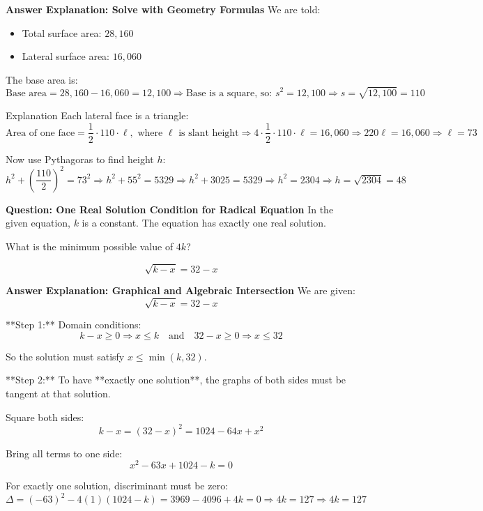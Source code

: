 \documentclass{beamer}
\begin{document}
\begin{frame}{\textbf{Answer Explanation: Solve with Geometry Formulas}}
\small
We are told:
\begin{itemize}
    \item Total surface area: $28,\!160$
    \item Lateral surface area: $16,\!060$
\end{itemize}

The base area is:
\[
\text{Base area} = 28,\!160 - 16,\!060 = 12,\!100

\Rightarrow \text{Base is a square, so: } s^2 = 12,\!100 \Rightarrow s = \sqrt{12,\!100} = 110
\]


\end{frame}

\begin{frame}{Explanation}
Each lateral face is a triangle:
\[
\text{Area of one face} = \frac{1}{2} \cdot 110 \cdot \ell, \text{ where } \ell \text{ is slant height}

\Rightarrow 4 \cdot \frac{1}{2} \cdot 110 \cdot \ell = 16,\!060
\Rightarrow 220 \ell = 16,\!060 \Rightarrow \ell = 73
\]

Now use Pythagoras to find height $h$:
\[
h^2 + \left(\frac{110}{2}\right)^2 = 73^2
\Rightarrow h^2 + 55^2 = 5329

\Rightarrow h^2 + 3025 = 5329

\Rightarrow h^2 = 2304

\Rightarrow h = \sqrt{2304} = \boxed{48}
\]
    
\end{frame}


\begin{frame}{\textbf{Question: One Real Solution Condition for Radical Equation}}
\small
In the given equation, $k$ is a constant. The equation has exactly one real solution.

What is the minimum possible value of $4k$?

\[
\sqrt{k - x} = 32 - x
\]
\end{frame}


\begin{frame}{\textbf{Answer Explanation: Graphical and Algebraic Intersection}}
\small
We are given:
\[
\sqrt{k - x} = 32 - x
\]

**Step 1:** Domain conditions:
\[
k - x \geq 0 \Rightarrow x \leq k \quad \text{and} \quad 32 - x \geq 0 \Rightarrow x \leq 32
\]

So the solution must satisfy $x \leq \min(k, 32)$.

**Step 2:** To have **exactly one solution**, the graphs of both sides must be tangent at that solution.

Square both sides:
\[
k - x = (32 - x)^2 = 1024 - 64x + x^2
\]

Bring all terms to one side:
\[
x^2 - 63x + 1024 - k = 0
\]

For exactly one solution, discriminant must be zero:
\[
\Delta = (-63)^2 - 4(1)(1024 - k) = 3969 - 4096 + 4k = 0
\Rightarrow 4k = 127 \Rightarrow \boxed{4k = 127}
\]
\end{frame}
\end{document}
